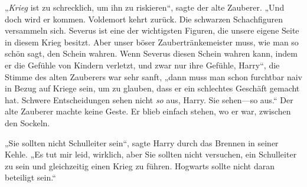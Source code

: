 „\emph{Krieg} ist zu schrecklich, um ihn zu riskieren“, sagte der alte Zauberer. „Und doch wird er kommen. Voldemort kehrt zurück. Die schwarzen Schachfiguren versammeln sich. Severus ist eine der wichtigsten Figuren, die unsere eigene Seite in diesem Krieg besitzt. Aber unser böser Zaubertränkemeister muss, wie man so schön sagt, den Schein wahren. Wenn Severus diesen Schein wahren kann, indem er die Gefühle von Kindern verletzt, und zwar nur ihre Gefühle, Harry“, die Stimme des alten Zauberers war sehr sanft, „dann muss man schon furchtbar naiv in Bezug auf Kriege sein, um zu glauben, dass er ein schlechtes Geschäft gemacht hat. Schwere Entscheidungen sehen nicht \emph{so} aus, Harry. Sie sehen—so aus.“ Der alte Zauberer machte keine Geste. Er blieb einfach stehen, wo er war, zwischen den Sockeln.

„Sie sollten nicht Schulleiter sein“, sagte Harry durch das Brennen in seiner Kehle. „Es tut mir leid, wirklich, aber Sie sollten nicht versuchen, ein Schulleiter zu sein und gleichzeitig einen Krieg zu führen. Hogwarts sollte nicht daran beteiligt sein.“

